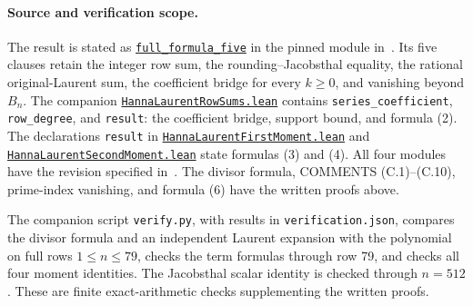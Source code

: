 \documentclass[11pt]{article}
\begin{document}
\paragraph{Source and verification scope.}
The result is stated as
\href{https://github.com/the-omega-institute/trureturing/blob/1239bd2a0ed6e9d54aabb5a42af94234e9eb61ae/D5/S3/ArithSums/HannaLaurentAlternatingJacobsthal.lean#L103}{\texttt{full\_formula\_five}} in the pinned
module in~\cite{formal}. Its five clauses retain the integer
row sum, the rounding--Jacobsthal equality, the rational original-Laurent sum,
the coefficient bridge for every $k\geq0$, and vanishing beyond $B_n$.
The companion
\href{https://github.com/the-omega-institute/trureturing/blob/1239bd2a0ed6e9d54aabb5a42af94234e9eb61ae/D5/S3/ArithSums/HannaLaurentRowSums.lean}{\texttt{HannaLaurentRowSums.lean}}
contains \texttt{series\_coefficient}, \texttt{row\_degree}, and
\texttt{result}: the coefficient bridge, support bound, and formula (2).
The declarations \texttt{result} in
\href{https://github.com/the-omega-institute/trureturing/blob/1239bd2a0ed6e9d54aabb5a42af94234e9eb61ae/D5/S3/ArithSums/HannaLaurentFirstMoment.lean}{\texttt{HannaLaurentFirstMoment.lean}}
and
\href{https://github.com/the-omega-institute/trureturing/blob/1239bd2a0ed6e9d54aabb5a42af94234e9eb61ae/D5/S3/ArithSums/HannaLaurentSecondMoment.lean}{\texttt{HannaLaurentSecondMoment.lean}}
state formulas (3) and (4). All four modules have the revision specified
in~\cite{formal}. The divisor formula, COMMENTS (C.1)--(C.10),
prime-index vanishing, and formula (6) have the written proofs above.

The companion script \texttt{verify.py}, with results in
\texttt{verification.json}, compares the divisor formula and an independent
Laurent expansion with the polynomial on full rows $1\leq n\leq79$,
checks the term formulas through row 79, and checks all four moment identities.
The Jacobsthal scalar identity is checked through $n=512$.
These are finite exact-arithmetic checks supplementing the written proofs.
\end{document}
